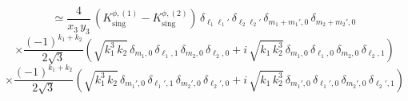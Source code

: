 %
%
\begin{equation*}
\simeq
\frac{4}{x_3 \, y_3} \,
\left(
K^{\phi,(1)}_{\mathrm{sing}}
-
K^{\phi,(2)}_{\mathrm{sing}}
\right) \, 
\delta_{\ell_1 \ell_1'} \, \delta_{\ell_2 \ell_2'} \,
\delta_{m_1+m_1',0} \, \delta_{m_2 + m_2',0} \, 
\end{equation*}
%
%
\begin{equation*}
\times
\frac{(-1)^{k_1+k_2}}{2 \sqrt{3}}
\left(
\sqrt{k_1^3 \, k_2} \, 
\delta_{m_1,0} \, \delta_{\ell_1,1} \, \delta_{m_2,0} \, \delta_{\ell_2,0}
+
i \, \sqrt{k_1 \, k_2^3} \, 
\delta_{m_1,0} \, \delta_{\ell_1,0} \, \delta_{m_2,0} \, \delta_{\ell_2,1}
\right)
\end{equation*}
%
%
\begin{equation*}
\times
\frac{(-1)^{k_1+k_2}}{2 \sqrt{3}}
\left(
\sqrt{k_1^3 \, k_2} \, 
\delta_{m_1',0} \, \delta_{\ell_1',1} \, \delta_{m_2',0} \, \delta_{\ell_2',0}
+
i \, \sqrt{k_1 \, k_2^3} \, 
\delta_{m_1',0} \, \delta_{\ell_1',0} \, \delta_{m_2',0} \, \delta_{\ell_2',1}
\right)
\end{equation*}
%
%

